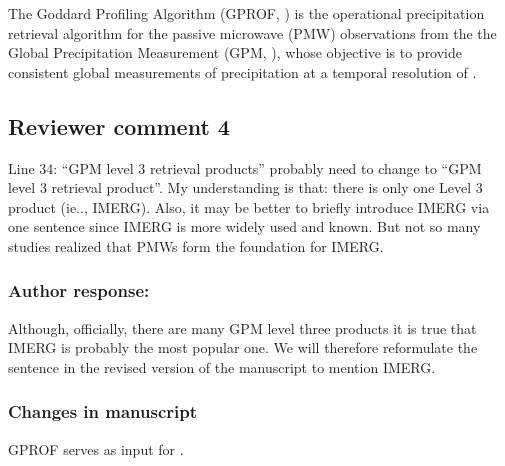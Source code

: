 \begin{change}[21]
  The Goddard Profiling Algorithm (GPROF, \citet{kummerow15}) is the operational
  precipitation retrieval algorithm for the passive microwave (PMW) observations
  from the \DIFdelbegin {}\DIFdelend \DIFaddbegin {}\DIFaddend the Global Precipitation Measurement (GPM,
  \citet{hou14})\DIFdelbegin {}\DIFdelend , whose objective is to provide consistent global measurements of
  precipitation at a temporal resolution of \DIFdelbegin {}\DIFdelend \DIFaddbegin {} \DIFaddend.
\end{change}



\subsection*{Reviewer comment 4}

Line 34: “GPM level 3 retrieval products” probably need to change to “GPM level 3 retrieval
product”. My understanding is that: there is only one Level 3 product (ie.., IMERG). Also, it may
be better to briefly introduce IMERG via one sentence since IMERG is more widely used and
known. But not so many studies realized that PMWs form the foundation for IMERG.

\subsubsection*{Author response:}

Although, officially, there are many GPM level three products it is
true that IMERG is probably the most popular one. We will therefore reformulate
the sentence in the revised version of the manuscript to mention IMERG.


\subsubsection*{Changes in manuscript}

\begin{change}[36]
  \DIFdelbegin {}\DIFdelend \DIFaddbegin {}\DIFaddend GPROF serves as input for \DIFdelbegin {}\DIFdelend \DIFaddbegin {}\DIFaddend .

\end{change}

